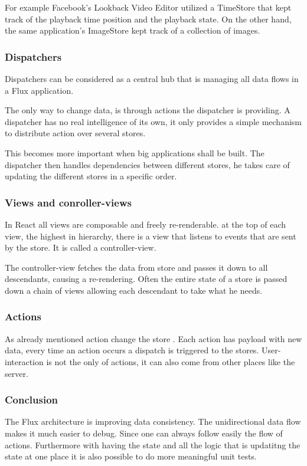 For example Facebook's Lookback Video Editor utilized a TimeStore that kept track of the playback time position and the playback state. On the other hand, the same application's ImageStore kept track of a collection of images.


\subsubsection{Dispatchers}
Dispatchers can be considered as a central hub that is managing all data flows in a Flux application.

The only way to change data, is through actions the dispatcher is providing.
A dispatcher has no real intelligence of its own, it only provides a simple mechanism to distribute action over several stores.

This becomes more important when big applications shall be built. The dispatcher then handles dependencies between different stores, he takes care of updating the different stores in a specific order.


\subsubsection{Views and conroller-views}

In React all views are composable and freely re-renderable. at the top of each view, the highest in hierarchy, there is a view that listens to events that are sent by the store. It is called a controller-view. 

The controller-view fetches the data from store and passes it down to all descendants, causing a re-rendering. Often the entire state of a store is passed down a chain of views allowing each descendant to take what he needs.

\subsubsection{Actions}
As already mentioned action change the store . Each action has payload with new data, every time an action occurs a dispatch is triggered to the stores. User-interaction is not the only of actions, it can also come from other places like the server.


\subsubsection{Conclusion}
The Flux architecture is improving data consistency. The unidirectional data flow makes it much easier to debug. Since one can always follow easily the flow of actions. Furthermore with having the state and all the logic that is updatitng the state at one place it is also possible to do more meaningful unit tests.

